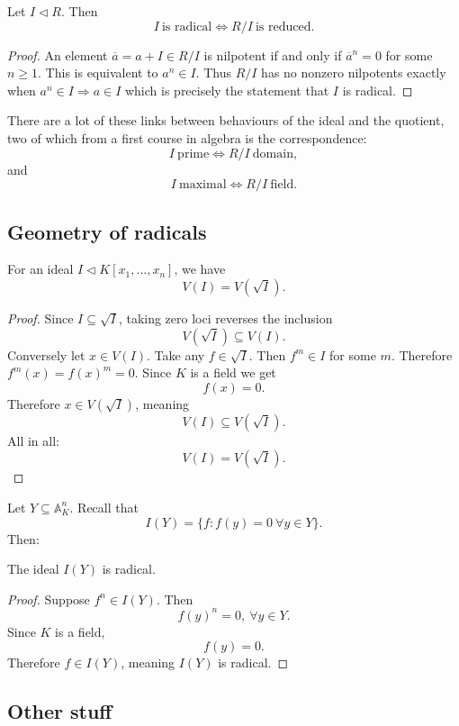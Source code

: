\documentclass[11pt]{article}
\begin{document}
\begin{prop}
    Let $I \triangleleft R$. Then 
    \[
        I \ \text{is radical} \Leftrightarrow 
        R/I \ \text{is reduced}. 
    \]
\end{prop}
\begin{proof}
    An element $\overline a = a + I \in R/I$ is nilpotent 
    if and only if $\overline a^n = 0$ for some $n \geq 1$.
    This is equivalent to $a^n \in I$. 
    Thus $R/I$ has no nonzero nilpotents exactly when 
    $a^n \in I \Rightarrow a \in I$ which is precisely the statement 
    that $I $ is radical. 
\end{proof}

There are a lot of these links between behaviours of the ideal 
and the quotient, two of which from a first course in algebra 
is the correspondence: 
\[
    I \ \text{prime} \Leftrightarrow R/I \ \text{domain}, 
\]
and 
\[
    I \ \text{maximal} \Leftrightarrow R/I \ \text{field}. 
\]

\subsection{Geometry of radicals}
For an ideal $I \triangleleft K[x_1,\ldots,x_n]$, we have 
\[
    V(I) = V(\sqrt{I}).
\]
\begin{proof}
    Since $I \subseteq \sqrt I$, taking zero loci reverses 
    the inclusion 
    \[
        V(\sqrt I) \subseteq V(I). 
    \]
    Conversely let $x \in V(I)$. Take any $f \in \sqrt{I}$. 
    Then $f^m \in I$ for some $m$. Therefore 
    $f^m(x) = f(x)^m = 0$. Since $K$ is a field we get 
    \[
        f(x) = 0.
    \]
    Therefore $x \in V(\sqrt I)$, meaning 
    \[
        V(I) \subseteq V(\sqrt I). 
    \]
    All in all: 
    \[
        V(I) = V(\sqrt I).
    \]
\end{proof}

Let $Y \subseteq \mathbb A_K^n$. Recall that 
\[
    I(Y) = \{f : f(y) = 0 \ \forall y \in Y\}. 
\]
Then: 
\begin{prop}
    The ideal $I(Y)$ is radical. 
\end{prop}
\begin{proof}
    Suppose $f^n \in I(Y)$. Then 
    \[
        f(y)^n = 0, \ \forall y \in Y. 
    \]
    Since $K$ is a field, 
    \[
        f(y) = 0. 
    \]
    Therefore $f \in I(Y)$, meaning $I(Y)$ is radical. 
\end{proof}

\subsection{Other stuff}
\end{document}
